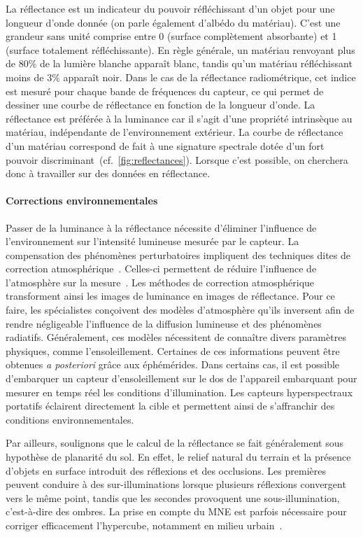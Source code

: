 La réflectance est un indicateur du pouvoir réfléchissant d'un objet pour une longueur d'onde donnée (on parle également d'albédo du matériau). C'est une grandeur sans unité comprise entre 0 (surface complètement absorbante) et 1 (surface totalement réfléchissante). En règle générale, un matériau renvoyant plus de 80\% de la lumière blanche apparaît blanc, tandis qu'un matériau réfléchissant moins de 3\% apparaît noir. Dans le cas de la réflectance radiométrique, cet indice est mesuré pour chaque bande de fréquences du capteur, ce qui permet de dessiner une courbe de réflectance en fonction de la longueur d'onde. La réflectance est préférée à la luminance car il s'agit d'une propriété intrinsèque au matériau, indépendante de l'environnement extérieur. La courbe de réflectance d'un matériau correspond de fait à une signature spectrale dotée d'un fort pouvoir discriminant~(cf.~\cref{fig:reflectances}). Lorsque c'est possible, on cherchera donc à travailler sur des données en réflectance.

\paragraph{Corrections environnementales}
Passer de la luminance à la réflectance nécessite d'éliminer l'influence de l'environnement sur l'intensité lumineuse mesurée par le capteur. La compensation des phénomènes perturbatoires impliquent des techniques dites de correction atmosphérique~\cite{deschamps_atmospheric_1980, rahman_smac_1994, chavez_image-based_1996}. Celles-ci permettent de réduire l'influence de l'atmosphère sur la mesure~\cite{gao_atmospheric_2009}. Les méthodes de correction atmosphérique transforment ainsi les images de luminance en images de réflectance. Pour ce faire, les spécialistes conçoivent des modèles d'atmosphère qu'ils inversent afin de rendre négligeable l'influence de la diffusion lumineuse et des phénomènes radiatifs. Généralement, ces modèles nécessitent de connaître divers paramètres physiques, comme l'ensoleillement. Certaines de ces informations peuvent être obtenues \emph{a posteriori} grâce aux éphémérides. Dans certains cas, il est possible d'embarquer un capteur d'ensoleillement sur le dos de l'appareil embarquant pour mesurer en temps réel les conditions d'illumination. Les capteurs hyperspectraux portatifs éclairent directement la cible et permettent ainsi de s'affranchir des conditions environnementales.

Par ailleurs, soulignons que le calcul de la réflectance se fait généralement sous hypothèse de planarité du sol. En effet, le relief natural du terrain et la présence d'objets en surface introduit des réflexions et des occlusions. Les premières peuvent conduire à des sur-illuminations lorsque plusieurs réflexions convergent vers le même point, tandis que les secondes provoquent une sous-illumination, c'est-à-dire des ombres. La prise en compte du \gls{MNE} est parfois nécessaire pour corriger efficacement l'hypercube, notamment en milieu urbain~\cite{ceamanos_using_2017}.


